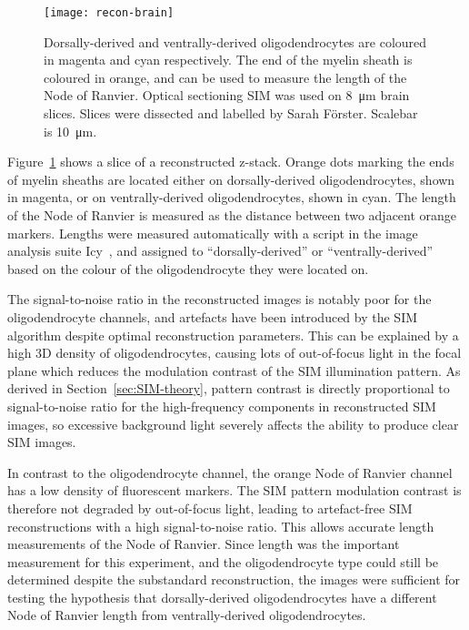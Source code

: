 \begin{figure}[tbp!]
\centering
\texttt{[image: recon-brain]}
\caption[LAG SIM: Multi-colour optical sectioning SIM to measure the node of Ranvier]{Dorsally-derived and ventrally-derived oligodendrocytes are coloured in magenta and cyan respectively. The end of the myelin sheath is coloured in orange, and can be used to measure the length of the Node of Ranvier. Optical sectioning SIM was used on \SI{8}{\micro\metre} brain slices. Slices were dissected and labelled by Sarah F{\"o}rster. Scalebar is \SI{10}{\micro\metre}. }
\label{fig:recon-brain}
\end{figure}
\afterpage{\clearpage}

Figure~\ref{fig:recon-brain} shows a slice of a reconstructed z-stack. 
Orange dots marking the ends of myelin sheaths are located either on dorsally-derived oligodendrocytes, shown in magenta, or on ventrally-derived oligodendrocytes, shown in cyan. 
The length of the Node of Ranvier is measured as the distance between two adjacent orange markers.
Lengths were measured automatically with a script in the image analysis suite Icy~\cite{de2012icy}, and assigned to ``dorsally-derived'' or ``ventrally-derived'' based on the colour of the oligodendrocyte they were located on. 

The signal-to-noise ratio in the reconstructed images is notably poor for the oligodendrocyte channels, and artefacts have been introduced by the SIM algorithm despite optimal reconstruction parameters. 
This can be explained by a high 3D density of oligodendrocytes, causing lots of out-of-focus light in the focal plane which reduces the modulation contrast of the SIM illumination pattern. 
As derived in Section~\ref{sec:SIM-theory}, pattern contrast is directly proportional to signal-to-noise ratio for the high-frequency components in reconstructed SIM images, so excessive background light severely affects the ability to produce clear SIM images. 

In contrast to the oligodendrocyte channel, the orange Node of Ranvier channel has a low density of fluorescent markers. 
The SIM pattern modulation contrast is therefore not degraded by out-of-focus light, leading to artefact-free SIM reconstructions with a high signal-to-noise ratio. 
This allows accurate length measurements of the Node of Ranvier. 
Since length was the important measurement for this experiment, and the oligodendrocyte type could still be determined despite the substandard reconstruction, the images were sufficient for testing the hypothesis that dorsally-derived oligodendrocytes have a different Node of Ranvier length from ventrally-derived oligodendrocytes. 

